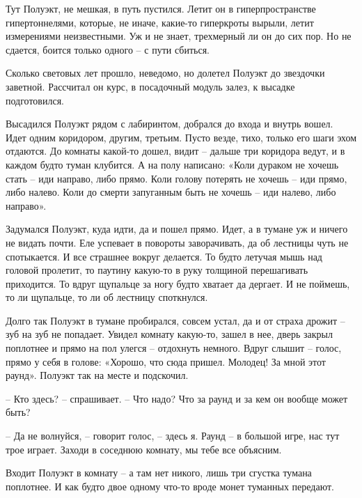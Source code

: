 \documentclass[ebook,oneside,final,openright]{memoir}
\begin{document}
\par
Тут Полуэкт, не мешкая, в путь пустился. Летит он в гиперпространстве гипертоннелями, которые, не иначе, какие-то гиперкроты вырыли, летит измерениями неизвестными. Уж и не знает, трехмерный ли он до сих пор. Но не сдается, боится только одного – с пути сбиться.\par
\par
Сколько световых лет прошло, неведомо, но долетел Полуэкт до звездочки заветной. Рассчитал он курс, в посадочный модуль залез, к высадке подготовился.\par
\par
Высадился Полуэкт рядом с лабиринтом, добрался до входа и внутрь вошел. Идет одним коридором, другим, третьим. Пусто везде, тихо, только его шаги эхом отдаются. До комнаты какой-то дошел, видит – дальше три коридора ведут, и в каждом будто туман клубится. А на полу написано: «Коли дураком не хочешь стать – иди направо, либо прямо. Коли голову потерять не хочешь – иди прямо, либо налево. Коли до смерти запуганным быть не хочешь – иди налево, либо направо».\par
\par
Задумался Полуэкт, куда идти, да и пошел прямо. Идет, а в тумане уж и ничего не видать почти. Еле успевает в повороты заворачивать, да об лестницы чуть не спотыкается. И все страшнее вокруг делается. То будто летучая мышь над головой пролетит, то паутину какую-то в руку толщиной перешагивать приходится. То вдруг щупальце за ногу будто хватает да дергает. И не поймешь, то ли щупальце, то ли об лестницу споткнулся.\par
\par
Долго так Полуэкт в тумане пробирался, совсем устал, да и от страха дрожит – зуб на зуб не попадает. Увидел комнату какую-то, зашел в нее, дверь закрыл поплотнее и прямо на пол улегся – отдохнуть немного. Вдруг слышит – голос, прямо у себя в голове: «Хорошо, что сюда пришел. Молодец! За мной этот раунд». Полуэкт так на месте и подскочил. \par
\par
– Кто здесь? – спрашивает. – Что надо? Что за раунд и за кем он вообще может быть?\par
– Да не волнуйся, – говорит голос, – здесь я. Раунд – в большой игре, нас тут трое играет. Заходи в соседнюю комнату, мы тебе все объясним.\par
 \par
Входит Полуэкт в комнату – а там нет никого, лишь три сгустка тумана поплотнее. И как будто двое одному что-то вроде монет туманных передают.\par
\end{document}
